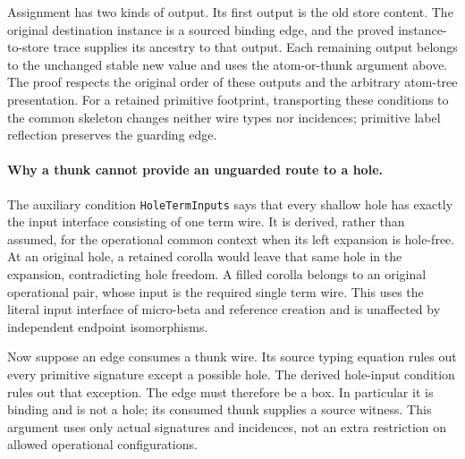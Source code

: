 Assignment has two kinds of output. Its first output is the old store content.
The original destination instance is a sourced binding edge, and the proved
instance-to-store trace supplies its ancestry to that output. Each remaining
output belongs to the unchanged stable new value and uses the atom-or-thunk
argument above. The proof respects the original order of these outputs and
the arbitrary atom-tree presentation. For a retained primitive footprint,
transporting these conditions to the common skeleton changes neither wire
types nor incidences; primitive label reflection preserves the guarding edge.


\paragraph{Why a thunk cannot provide an unguarded route to a hole.}
The auxiliary condition \texttt{HoleTermInputs} says that every shallow hole
has exactly the input interface consisting of one term wire. It is derived,
rather than assumed, for the operational common context when its left
expansion is hole-free. At an original hole, a retained corolla would leave
that same hole in the expansion, contradicting hole freedom. A filled
corolla belongs to an original operational pair, whose input is the required
single term wire. This uses the literal input interface of micro-beta and
reference creation and is unaffected by independent endpoint isomorphisms.

Now suppose an edge consumes a thunk wire. Its source typing equation rules
out every primitive signature except a possible hole. The derived hole-input
condition rules out that exception. The edge must therefore be a box. In
particular it is binding and is not a hole; its consumed thunk supplies a
source witness. This argument uses only actual signatures and incidences,
not an extra restriction on allowed operational configurations.


